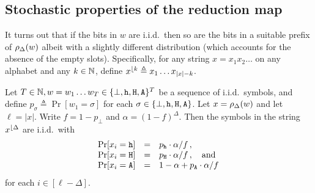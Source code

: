 \subsection{Stochastic properties of the reduction map}
It turns out that 
if the bits in $w$ are i.i.d.\ then 
so are the bits in a suitable prefix of $\rho_\Delta(w)$ 
albeit with a slightly different distribution 
(which accounts for the absence of the empty slots). 
Specifically, for any string $x = x_1 x_2 \ldots $ on any alphabet and any $k \in \mathbb{N}$, 
define $x^{\lfloor {k}} \triangleq x_1 \ldots x_{|x| - k}$.

\begin{proposition}\label{prop:reduction-indep}
  Let $T \in \mathbb{N}, w = w_1 \ldots w_T \in \{\perp, \mathtt{h}, \mathtt{H}, \mathtt{A}\}^T$ 
  be a sequence of i.i.d.\ symbols, 
  and define $p_\sigma \triangleq \Pr[w_1 = \sigma]$ for each $\sigma \in \{\perp, \mathtt{h}, \mathtt{H}, \mathtt{A}\}$.
  Let $x = \rho_\Delta(w)$ and let $\ell = |x|$. 
  Write $f = 1 - p_\perp$ and $\alpha = (1 - f)^\Delta$. 
  Then the symbols in the string $x^{\lfloor {\Delta}}$ are i.i.d.\ 
  with 
  \begin{align}\label{eq:reduction-dist}
    \begin{matrix*}[l]
      \Pr[x_i = \h] &=& p_\h \cdot \alpha / f\,, \\
      \Pr[x_i = \H] &=& p_\H \cdot \alpha / f\,, \quad \text{and}\\
      \Pr[x_i = \A] &=& 1 - \alpha + p_\A \cdot \alpha / f\,
    \end{matrix*}
  \end{align}
  for each $i \in [\ell - \Delta]$.
\end{proposition}
